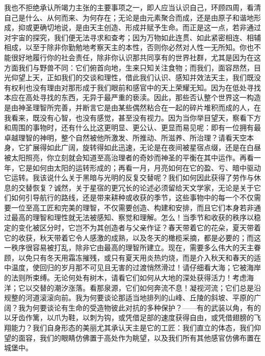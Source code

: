 我也不拒绝承认所竭力主张的主要事项之一，即人应当认识自己，环顾四周，看清自己是什么、从何而来、为何存在；无论是由元素聚合而成，还是由原子和谐地形成，抑或更确切地说，是由天主创造、形成并赋予生命。而正是这一点，若非通过对宇宙的探究，我们便无法寻求和查考；因为万物如此连贯、如此紧密相连、相辅相成，以至于除非你勤勉地考察天主的本性，否则你必然对人性一无所知。你也不能很好地履行你的社会责任，除非你认识那共同享有的世界社群，尤其是因为在这方面我们与野兽不同：它们俯首向地，生来只知关注食物；而我们，面容昂然，目光仰望上天，正如我们的交谈和理性，借此我们认识、感知并效法天主，我们既没有权利也没有理由对那形成于我们眼前和感官中的天上荣耀无知。因为在低处寻找本应在高处寻找的东西，无异于最严重的亵渎。因此，那些否认整个世界这一构造是由神圣理智所完善，并断言它是由某些偶然粘合在一起的碎片堆积而成的人，在我看来，既没有心智，也没有感觉，甚至没有视力。因为当你举目望天，察看下方和周围的事物时，还有什么比这更明显、更公认、更显而易见呢：即有一位拥有最卓越理智的神明，整个自然被他所激发、所推动、所滋养、所治理？请看天空本身，它扩展得如此广阔，旋转得如此迅速，无论是在夜间被星宿点缀，还是在白昼被太阳照亮，你立刻就会知道至高治理者的奇妙而神圣的平衡在其中运作。再看一年，它是如何由太阳的运转形成的；再看一月，月亮如何在它的盈、亏、暗中驱动它运转。我该说什么关于黑暗与光明的反复交替呢？我们如何因此获得了劳作与休息的交替恢复？诚然，关于星宿的更冗长的论述必须留给天文学家，无论是关于它们如何引导航行的路线，还是带来耕种或收获的季节，这些事物中的每一个不仅需要一位至高工匠和完美的理智，不仅需要创造、构建和安排，而且它们本身若非通过最高的理智和理性就无法被感知、察觉和理解。怎么！当季节和收获的秩序以稳定的变化被区分时，它岂不为其创造者与父亲作证？春天带着它的花朵，夏天带着它的收获，秋天带着它令人感激的成熟，以及冬天的橄榄采摘，都是必要的；而这一秩序很容易被打乱，除非它由最高的理智所建立。现在，需要多么伟大的天主眷顾，以免只有冬天用霜冻摧残，或只有夏天用炎热灼烧，而是介入秋天和春天的适中温度，使回归的岁月那不可见且无害的过渡悄然滑过！请仔细看大海；它被海岸的法则所束缚。无论何处有树木，请看它们如何从大地的深处获得活力！考虑海洋；它以交替的潮汐涨落。看那泉源，它们如何奔流不息！凝视河流；它们总是沿规整的河道滚滚向前。我为何要谈论那适当地排列的山峰、丘陵的斜坡、平原的广阔？我为何要谈论有生命的受造物彼此对抗的多种保护？——有的武装以角，有的以牙齿作篱，以爪为鞋，以刺为钩，或凭借足部的速度获得自由，或凭借翅膀的飞翔能力？我们自身形态的美丽尤其承认天主是它的工匠：我们直立的体态，我们仰望的面容，我们的眼睛仿佛置于高处作为眺望，以及我们所有其他感官仿佛布置在城堡中。\par


